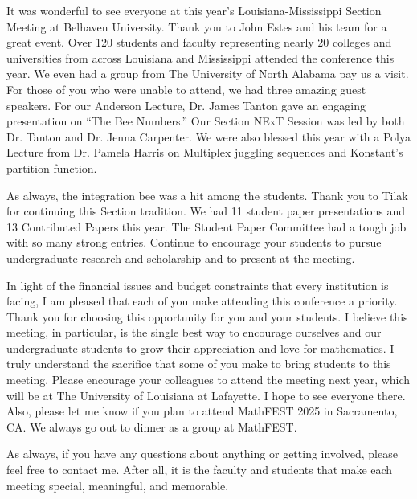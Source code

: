 \documentclass[10pt]{article} %
\begin{document}
\begin{minipage}[t]{.66\linewidth} %

  \hypertarget{message-sectionchair}{} %

  It was wonderful to see everyone at this year’s Louisiana-Mississippi Section Meeting at Belhaven University.
  Thank you to John Estes and his team for a great event.
  Over 120 students and faculty representing nearly 20 colleges and universities from across Louisiana and Mississippi attended the conference this year.
  We even had a group from The University of North Alabama pay us a visit.
  For those of you who were unable to attend, we had three amazing guest speakers.
  For our Anderson Lecture, Dr. James Tanton gave an engaging presentation on “The Bee Numbers.”
  Our Section NExT Session was led by both Dr. Tanton and Dr. Jenna Carpenter. 
  We were also blessed this year with a Polya Lecture from Dr. Pamela Harris on Multiplex juggling sequences and Konstant’s partition function.

  As always, the integration bee was a hit among the students.
  Thank you to Tilak for continuing this Section tradition.
  We had 11 student paper presentations and 13 Contributed Papers this year.
  The Student Paper Committee had a tough job with so many strong entries.
  Continue to encourage your students to pursue undergraduate research and scholarship and to present at the meeting.

  In light of the financial issues and budget constraints that every institution is facing, I am pleased that each of you make attending this conference a priority.
  Thank you for choosing this opportunity for you and your students.
  I believe this meeting, in particular, is the single best way to encourage ourselves and our undergraduate students to grow their appreciation and love for mathematics.
  I truly understand the sacrifice that some of you make to bring students to this meeting.
  Please encourage your colleagues to attend the meeting next year, which will be at The University of Louisiana at Lafayette.
  I hope to see everyone there.
  Also, please let me know if you plan to attend MathFEST 2025 in Sacramento, CA.
  We always go out to dinner as a group at MathFEST.

  As always, if you have any questions about anything or getting involved, please feel free to contact me.
  After all, it is the faculty and students that make each meeting special, meaningful, and memorable.  


\end{minipage}
\end{document}
